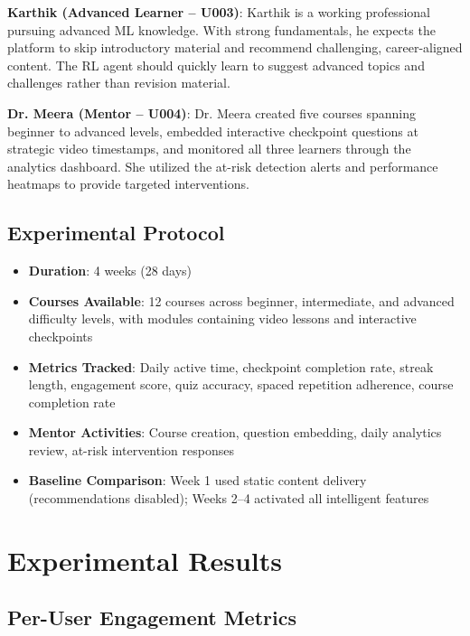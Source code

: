\documentclass[conference]{IEEEtran}
\begin{document}
\textbf{Karthik (Advanced Learner -- U003)}: Karthik is a working professional pursuing advanced ML knowledge. With strong fundamentals, he expects the platform to skip introductory material and recommend challenging, career-aligned content. The RL agent should quickly learn to suggest advanced topics and challenges rather than revision material.

\textbf{Dr. Meera (Mentor -- U004)}: Dr. Meera created five courses spanning beginner to advanced levels, embedded interactive checkpoint questions at strategic video timestamps, and monitored all three learners through the analytics dashboard. She utilized the at-risk detection alerts and performance heatmaps to provide targeted interventions.

\subsection{Experimental Protocol}

\begin{itemize}
    \item \textbf{Duration}: 4 weeks (28 days)
    \item \textbf{Courses Available}: 12 courses across beginner, intermediate, and advanced difficulty levels, with modules containing video lessons and interactive checkpoints
    \item \textbf{Metrics Tracked}: Daily active time, checkpoint completion rate, streak length, engagement score, quiz accuracy, spaced repetition adherence, course completion rate
    \item \textbf{Mentor Activities}: Course creation, question embedding, daily analytics review, at-risk intervention responses
    \item \textbf{Baseline Comparison}: Week 1 used static content delivery (recommendations disabled); Weeks 2--4 activated all intelligent features
\end{itemize}

\section{Experimental Results}

\subsection{Per-User Engagement Metrics}
\end{document}

